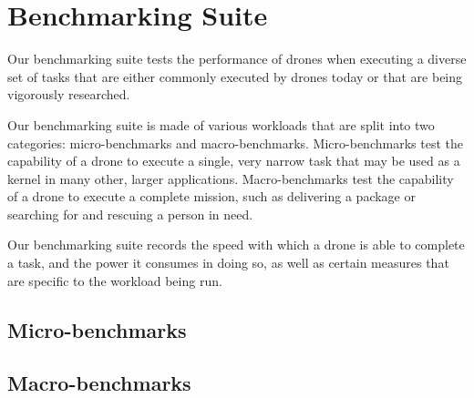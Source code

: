 \section{Benchmarking Suite}



Our benchmarking suite tests the performance of drones when executing a diverse set of tasks that are either commonly executed by drones today or that are being vigorously researched.

Our benchmarking suite is made of various workloads that are split into two categories: micro-benchmarks and macro-benchmarks. Micro-benchmarks test the capability of a drone to execute a single, very narrow task that may be used as a kernel in many other, larger applications. Macro-benchmarks test the capability of a drone to execute a complete mission, such as delivering a package or searching for and rescuing a person in need.

Our benchmarking suite records the speed with which a drone is able to complete a task, and the power it consumes in doing so, as well as certain measures that are specific to the workload being run.

\subsection{Micro-benchmarks}

\subsection{Macro-benchmarks}
